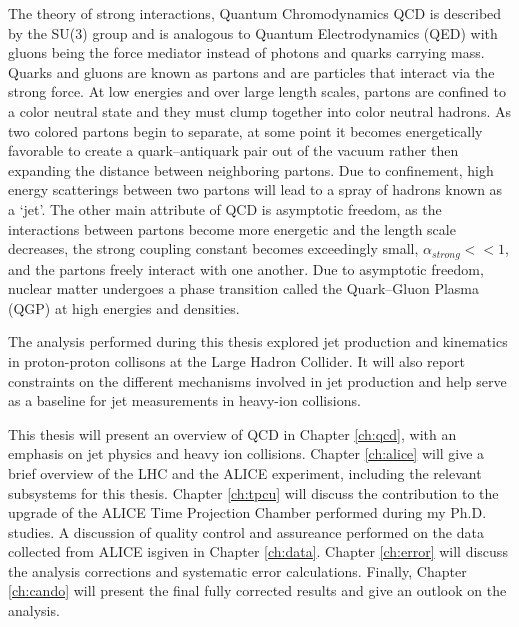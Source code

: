 \par
The theory of strong interactions, Quantum Chromodynamics QCD is described by the SU(3) group and is analogous to Quantum Electrodynamics (QED) with gluons being the force mediator instead of photons and quarks carrying mass.  Quarks and gluons are known as partons and are particles that interact via the strong force.  At low energies and over large length scales, partons are confined to a color neutral state and they must clump together into color neutral hadrons.  As two colored partons begin to separate, at some point it becomes energetically favorable to create a quark--antiquark pair out of the vacuum rather then expanding the distance between neighboring partons.  Due to confinement, high energy scatterings between two partons will lead to a spray of hadrons known as a `jet'.  The other main attribute of QCD is asymptotic freedom, as the interactions between partons become more energetic and the length scale decreases, the strong coupling constant becomes exceedingly small, $ \alpha_{strong} << 1$, and the partons freely interact with one another.  Due to asymptotic freedom, nuclear matter undergoes a phase transition called the Quark--Gluon Plasma (QGP) at high energies and densities. 

\par
The analysis performed during this thesis explored jet production and kinematics in proton-proton collisons at the Large Hadron Collider.  It will also report constraints on the different mechanisms involved in jet production and help serve as a baseline for jet measurements in heavy-ion collisions.

This thesis will present an overview of QCD in Chapter \ref{ch:qcd}, with an emphasis on jet physics and heavy ion collisions.  Chapter \ref{ch:alice} will give a brief overview of the LHC and the ALICE experiment, including the relevant subsystems for this thesis.  Chapter \ref{ch:tpcu} will discuss the contribution to the upgrade of the ALICE Time Projection Chamber performed during my Ph.D. studies.  A discussion of quality control and assureance performed on the data collected from ALICE isgiven in Chapter \ref{ch:data}.  Chapter \ref{ch:error} will discuss the analysis corrections and systematic error calculations.  Finally, Chapter \ref{ch:cando} will present the final fully corrected results and give an outlook on the analysis. 